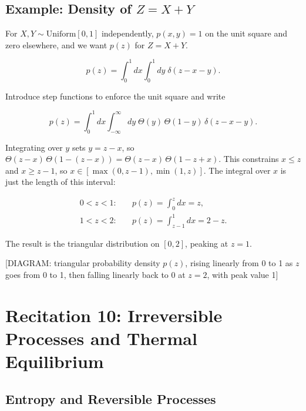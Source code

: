 \subsection{Example: Density of \texorpdfstring{$Z=X+Y$}{Z=X+Y}}

For $X,Y\sim\mathrm{Uniform}[0,1]$ independently, $p(x,y)=1$ on the unit square and zero elsewhere, and we want $p(z)$ for $Z=X+Y$.

\begin{equation}
  p(z) = \int_0^1 dx\int_0^1 dy\;\delta(z-x-y).
\end{equation}

Introduce step functions to enforce the unit square and write

\begin{equation}
  p(z) = \int_0^1 dx\int_{-\infty}^{\infty} dy\;\Theta(y)\,\Theta(1-y)\,\delta(z-x-y).
\end{equation}

Integrating over $y$ sets $y=z-x$, so $\Theta(z-x)\,\Theta(1-(z-x))=\Theta(z-x)\,\Theta(1-z+x)$. This constrains $x\le z$ and $x\ge z-1$, so $x\in[\max(0,z-1),\min(1,z)]$. The integral over $x$ is just the length of this interval:

\begin{align}
  0 < z < 1: &\quad p(z) = \int_0^z dx = z, \\
  1 < z < 2: &\quad p(z) = \int_{z-1}^1 dx = 2-z.
\end{align}

The result is the triangular distribution on $[0,2]$, peaking at $z=1$.

\begin{center}[DIAGRAM: triangular probability density $p(z)$, rising linearly from 0 to 1 as $z$ goes from 0 to 1, then falling linearly back to 0 at $z=2$, with peak value 1]\end{center}

\section{Recitation 10: Irreversible Processes and Thermal Equilibrium}

\subsection{Entropy and Reversible Processes}

